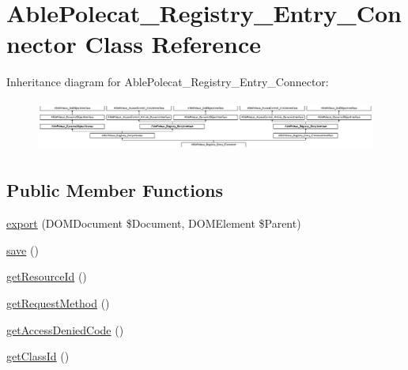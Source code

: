 \hypertarget{class_able_polecat___registry___entry___connector}{}\section{Able\+Polecat\+\_\+\+Registry\+\_\+\+Entry\+\_\+\+Connector Class Reference}
\label{class_able_polecat___registry___entry___connector}
Inheritance diagram for Able\+Polecat\+\_\+\+Registry\+\_\+\+Entry\+\_\+\+Connector\+:\begin{figure}[H]
\begin{center}
\leavevmode
\includegraphics[height=1.707317cm]{class_able_polecat___registry___entry___connector}
\end{center}
\end{figure}
\subsection*{Public Member Functions}
\begin{DoxyCompactItemize}
\item 
\hyperlink{class_able_polecat___registry___entry___connector_a0a05b2e4b3a44390eeb042064e427b1a}{export} (D\+O\+M\+Document \$Document, D\+O\+M\+Element \$Parent)
\item 
\hyperlink{class_able_polecat___registry___entry___connector_afc8a3c62679cf00ade9f15fb2a6d6132}{save} ()
\item 
\hyperlink{class_able_polecat___registry___entry___connector_a0ac412173b2b1d569ef90a1ac095ca5d}{get\+Resource\+Id} ()
\item 
\hyperlink{class_able_polecat___registry___entry___connector_ae534469d94a650b89ceb36b968bd3727}{get\+Request\+Method} ()
\item 
\hyperlink{class_able_polecat___registry___entry___connector_a62bff70fdf72bd7a3e5bd844978d4322}{get\+Access\+Denied\+Code} ()
\item 
\hyperlink{class_able_polecat___registry___entry___connector_acc9039051a8b6d4fe7c5ddfbaedbcbcb}{get\+Class\+Id} ()
\end{DoxyCompactItemize}
